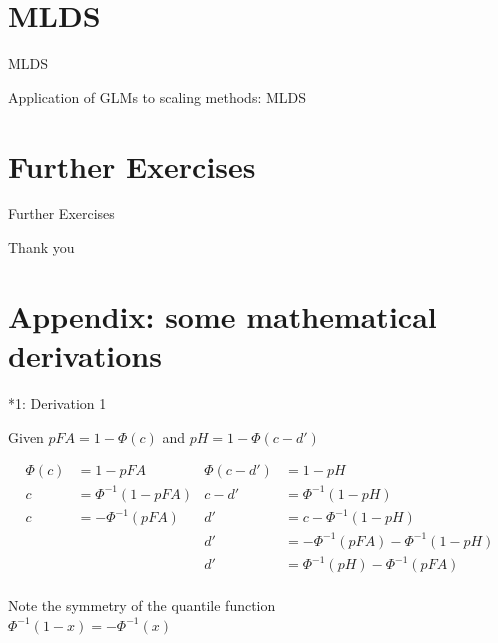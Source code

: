\documentclass[10pt]{beamer}
\begin{document}
\section{MLDS}
\begin{frame}{MLDS}

Application of GLMs to scaling methods: MLDS


\end{frame}


\section{Further Exercises}
\begin{frame}{Further Exercises}


\end{frame}



\begin{frame}
\begin{center}
{\Huge Thank you}
\end{center}
\end{frame}

\section{Appendix: some mathematical derivations}
\begin{frame}{*1: Derivation 1}
\begin{center}
Given $pFA = 1 - \Phi(c)$ and $pH = 1 - \Phi(c - d')$

\begin{align*}
\Phi(c) & = 1 - pFA & \Phi(c - d') & = 1 - pH\\
c & = \Phi^{-1}(1 - pFA) & c - d' & = \Phi^{-1}(1 - pH) \\
c & = -\Phi^{-1}(pFA)  &  d' & = c - \Phi^{-1}(1 - pH)  \\
& & d' & = -\Phi^{-1}(pFA)  - \Phi^{-1}(1 - pH) \\
& & d' & = \Phi^{-1}(pH) - \Phi^{-1}(pFA)\\
\end{align*}

Note the symmetry of the quantile function\\
$\Phi^{-1}(1-x) = -\Phi^{-1}(x)$
\end{center}
\end{frame}
\end{document}
